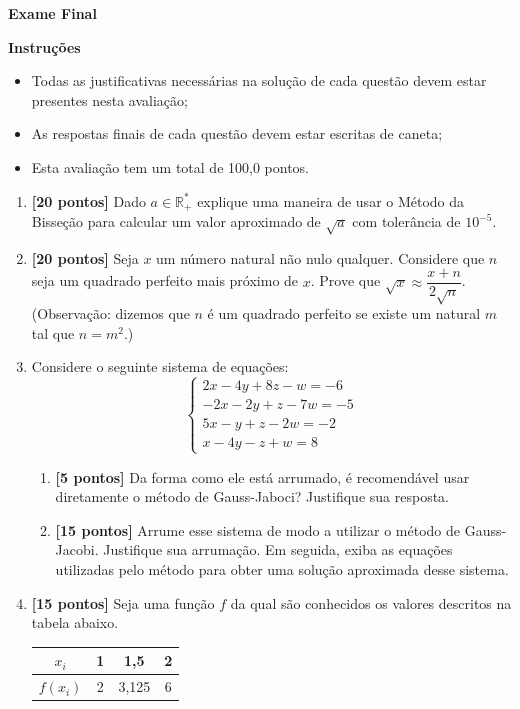 \documentclass[10pt,a4paper]{article}
\begin{document}
\begin{center}
 \textbf{Exame Final}
\end{center}

\textbf{Instruções}
\begin{itemize}
 \item Todas as justificativas necessárias na solução de cada questão devem estar presentes nesta avaliação;
 \item As respostas finais de cada questão devem estar escritas de caneta;
 \item Esta avaliação tem um total de 100,0 pontos.
\end{itemize}

\begin{enumerate}

 \item \textbf{[20 pontos]} Dado $a\in\mathbb{R}_+^*$ explique uma maneira de usar o Método da Bisseção para calcular um valor aproximado de $\sqrt{a}$ com tolerância de $10^{-5}$.

 \item \textbf{[20 pontos]} Seja $x$ um número natural não nulo qualquer. Considere que $n$ seja um quadrado perfeito mais próximo de $x$. Prove que $\sqrt{x}\approx \dfrac{x+n}{2\sqrt{n}}$. 
 (Observação: dizemos que $n$ é um quadrado perfeito se existe um natural $m$ tal que $n = m^2$.)

 \item Considere o seguinte sistema de equações:
  $$%
   \begin{cases}
    2x - 4y + 8z  - w = -6 \\
    -2x  - 2y + z - 7w = -5 \\
    5x  - y + z - 2w = -2 \\
    x - 4y - z + w = 8
   \end{cases}
  $$

  \begin{enumerate}
   \item \textbf{[5 pontos]} Da forma como ele está arrumado, é recomendável usar diretamente o método de Gauss-Jaboci? Justifique sua resposta.
   \item \textbf{[15 pontos]} Arrume esse sistema de modo a utilizar o método de Gauss-Jacobi. Justifique sua arrumação. Em seguida, exiba as equações 
         utilizadas pelo método para obter uma solução aproximada desse sistema.
  \end{enumerate}
 
 \item \textbf{[15 pontos]} Seja uma função $f$ da qual são conhecidos os valores descritos na tabela abaixo.
  \begin{center}
   \begin{tabular}{c|c|c|c}
    $x_i$ & 1 & 1,5 & 2\\ \hline
    $f(x_i)$ & 2 & 3,125 & 6
   \end{tabular}
  \end{center}


\end{enumerate}
\end{document}
